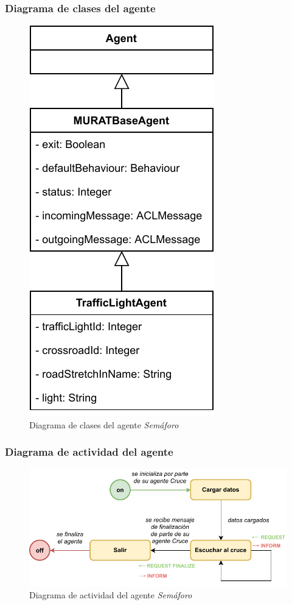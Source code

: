 \subsubsection{Diagrama de clases del agente}
\begin{figure}[H]
    \centering
    \includegraphics[width=0.35\linewidth]{text/image/DAgen-DC-TrafficLight.pdf}
    \caption{Diagrama de clases del agente \textit{Semáforo}}
    \label{fig:dc_agente_semaforo}
\end{figure}

\subsubsection{Diagrama de actividad del agente}
\begin{figure}[H]
    \centering
    \includegraphics[width=1\linewidth]{text/image/DAgen-DA-TrafficLight.pdf}
    \caption{Diagrama de actividad del agente \textit{Semáforo}}
    \label{fig:da_agente_semaforo}
\end{figure}

